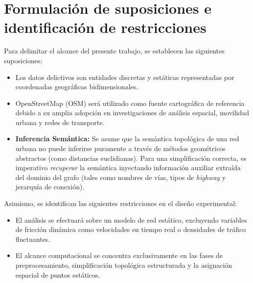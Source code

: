 \section{Formulación de suposiciones e identificación de restricciones}

Para delimitar el alcance del presente trabajo, se establecen las siguientes suposiciones:
\begin{itemize}
    \item Los datos delictivos son entidades discretas y estáticas representadas por coordenadas geográficas bidimensionales.
    
    \item OpenStreetMap (OSM) será utilizado como fuente cartográfica de referencia debido a su amplia adopción en investigaciones de análisis espacial, movilidad urbana y redes de transporte.

    \item \textbf{Inferencia Semántica:} Se asume que la semántica topológica de una red urbana no puede inferirse puramente a través de métodos geométricos abstractos (como distancias euclidianas). Para una simplificación correcta, es imperativo \textit{recuperar} la semántica inyectando información auxiliar extraída del dominio del grafo (tales como nombres de vías, tipos de \textit{highway} y jerarquía de conexión).
\end{itemize}

Asimismo, se identifican las siguientes restricciones en el diseño experimental:
\begin{itemize}
    \item El análisis se efectuará sobre un modelo de red estático, excluyendo variables de fricción dinámica como velocidades en tiempo real o densidades de tráfico fluctuantes.
    \item El alcance computacional se concentra exclusivamente en las fases de preprocesamiento, simplificación topológica estructurada y la asignación espacial de puntos estáticos.
\end{itemize}